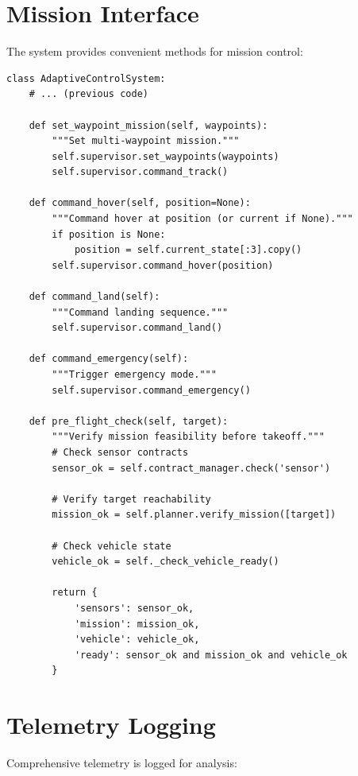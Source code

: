 \section{Mission Interface}

The system provides convenient methods for mission control:

\begin{lstlisting}[caption={Mission control interface}]
class AdaptiveControlSystem:
    # ... (previous code)

    def set_waypoint_mission(self, waypoints):
        """Set multi-waypoint mission."""
        self.supervisor.set_waypoints(waypoints)
        self.supervisor.command_track()

    def command_hover(self, position=None):
        """Command hover at position (or current if None)."""
        if position is None:
            position = self.current_state[:3].copy()
        self.supervisor.command_hover(position)

    def command_land(self):
        """Command landing sequence."""
        self.supervisor.command_land()

    def command_emergency(self):
        """Trigger emergency mode."""
        self.supervisor.command_emergency()

    def pre_flight_check(self, target):
        """Verify mission feasibility before takeoff."""
        # Check sensor contracts
        sensor_ok = self.contract_manager.check('sensor')

        # Verify target reachability
        mission_ok = self.planner.verify_mission([target])

        # Check vehicle state
        vehicle_ok = self._check_vehicle_ready()

        return {
            'sensors': sensor_ok,
            'mission': mission_ok,
            'vehicle': vehicle_ok,
            'ready': sensor_ok and mission_ok and vehicle_ok
        }
\end{lstlisting}

\section{Telemetry Logging}

Comprehensive telemetry is logged for analysis:

